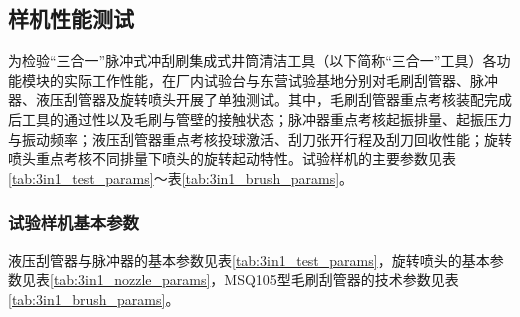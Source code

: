 
\subsection{样机性能测试}
\label{subsec:3in1_performance_test}

为检验“三合一”脉冲式冲刮刷集成式井筒清洁工具（以下简称“三合一”工具）各功能模块的实际工作性能，在厂内试验台与东营试验基地分别对毛刷刮管器、脉冲器、液压刮管器及旋转喷头开展了单独测试。其中，毛刷刮管器重点考核装配完成后工具的通过性以及毛刷与管壁的接触状态；脉冲器重点考核起振排量、起振压力与振动频率；液压刮管器重点考核投球激活、刮刀张开行程及刮刀回收性能；旋转喷头重点考核不同排量下喷头的旋转起动特性。试验样机的主要参数见表\ref{tab:3in1_test_params}～表\ref{tab:3in1_brush_params}。

\subsubsection{试验样机基本参数}

液压刮管器与脉冲器的基本参数见表\ref{tab:3in1_test_params}，旋转喷头的基本参数见表\ref{tab:3in1_nozzle_params}，MSQ105型毛刷刮管器的技术参数见表\ref{tab:3in1_brush_params}。


